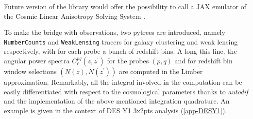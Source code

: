 \documentclass[final,5p,times,twocolumn,authoryear]{elsarticle}
\begin{document}
Future version of the library would offer the possibility to call a JAX emulator of the Cosmic Linear Anisotropy Solving System \citep{2011JCAP...07..034B}.

To make the bridge with observations, two pytrees are introduced, namely \texttt{NumberCounts} and \texttt{WeakLensing} tracers for galaxy clustering and weak lensing  respectively,  with for each probe a bunch of redshift bins. A long this line, the angular power spectra $C_\ell^{pq}(z,z^\prime)$ for the probes $(p,q)$ and for redshift bin window selections $(N(z), N(z^\prime))$ are computed in the Limber approximation. 
Remarkably, all the integral involved in the computation can be easily differentiated with respect to the cosmological parameters thanks to \textit{autodif} and the implementation of the above mentioned integration quadrature.  An example is given in the context of DES Y1 3x2pts analysis (\ref{app-DESY1}).















\end{document}
